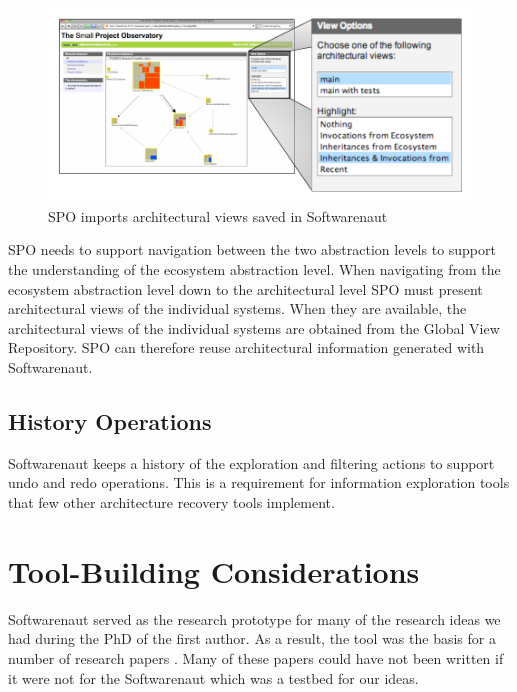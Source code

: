\documentclass[preprint,12pt]{elsarticle}
\begin{document}
\begin{figure}[ht]
\begin{center}
\includegraphics[width=\linewidth]{SpoArchitectural}
\caption{SPO imports architectural views saved in Softwarenaut}
\label{}
\end{center}
\end{figure}


SPO needs to support navigation between the two abstraction levels to support the understanding of  the ecosystem abstraction level. When navigating from the ecosystem abstraction level down to the architectural level SPO must present architectural views of the individual systems. When they are available, the architectural views of the individual systems are obtained from the Global View Repository. SPO can therefore reuse architectural information generated with Softwarenaut.

\subsection {History Operations} Softwarenaut keeps a history of the exploration and filtering actions to support undo and redo operations. This is a requirement for information exploration tools \cite{shneid-eyes} that few other architecture recovery tools implement.


\section {Tool-Building Considerations}
\label {sec:disc}

Softwarenaut served as the research prototype for many of the research ideas we had during the PhD of the first author. As a result, the tool was the basis for a number of research papers \cite{lungu-cutedge, lungu-clust, lungu-packages, lungu-relevo}. Many of these papers could have not been written if it were not for the Softwarenaut which was a testbed for our ideas. 
\end{document}
